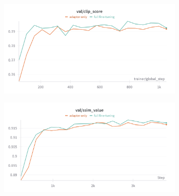 \begin{figure}[htbp]
  \centering
  \begin{subfigure}[b]{0.48\textwidth}
    \centering
    \includegraphics[width=\textwidth]{images/experiments/adapter_vs_full/clip_score.png}
    \label{fig:exp_adap_vs_full_clip}
  \end{subfigure}
  \hfill
  \begin{subfigure}[b]{0.48\textwidth}
    \centering
    \includegraphics[width=\textwidth]{images/experiments/adapter_vs_full/ssim.png}
    \label{fig:exp_adap_vs_full_ssim}
  \end{subfigure}


\end{figure}
